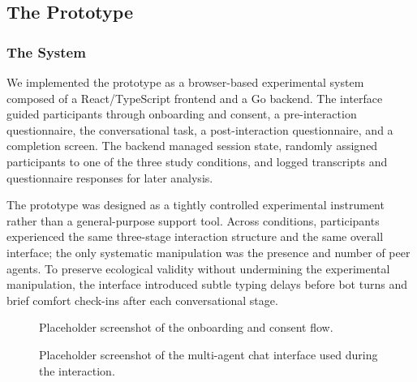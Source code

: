 \documentclass[sigconf]{acmart}
\begin{document}
\subsection{The Prototype}

\subsubsection{The System}
We implemented the prototype as a browser-based experimental system composed of a React/TypeScript frontend and a Go backend. The interface guided participants through onboarding and consent, a pre-interaction questionnaire, the conversational task, a post-interaction questionnaire, and a completion screen. The backend managed session state, randomly assigned participants to one of the three study conditions, and logged transcripts and questionnaire responses for later analysis.

The prototype was designed as a tightly controlled experimental instrument rather than a general-purpose support tool. Across conditions, participants experienced the same three-stage interaction structure and the same overall interface; the only systematic manipulation was the presence and number of peer agents. To preserve ecological validity without undermining the experimental manipulation, the interface introduced subtle typing delays before bot turns and brief comfort check-ins after each conversational stage.

\begin{figure}[t]
    \centering
    \caption{Placeholder screenshot of the onboarding and consent flow.}
    \label{fig:prototype-onboarding}
\end{figure}

\begin{figure}[t]
    \centering
    \caption{Placeholder screenshot of the multi-agent chat interface used during the interaction.}
    \label{fig:prototype-chat}
\end{figure}
\end{document}
